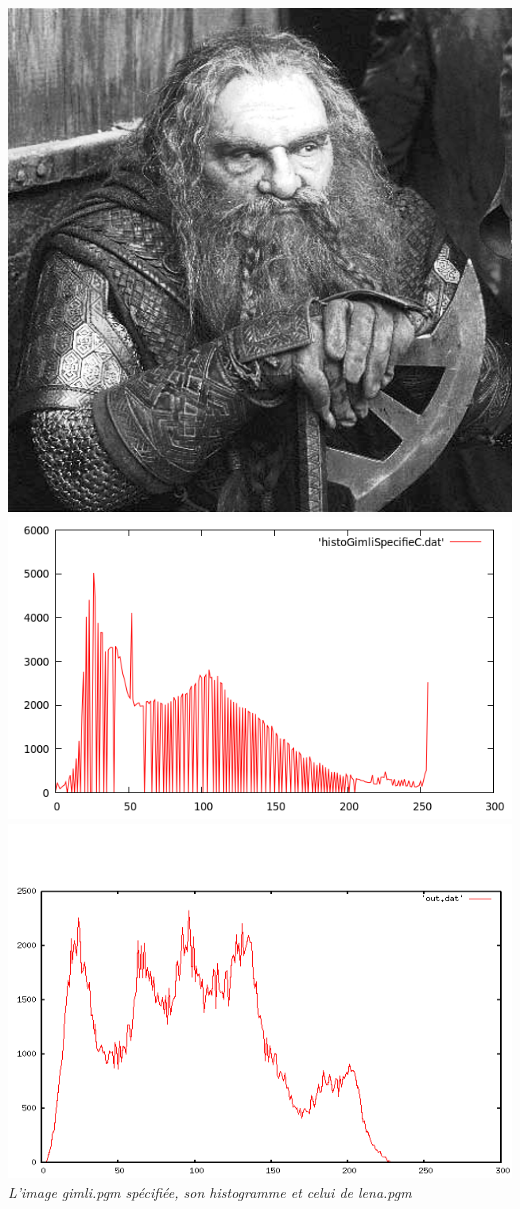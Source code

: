 \documentclass[a4paper,11pt]{article}
\begin{document}
\begin{center}
\includegraphics[scale=0.5]{gimlispecifiec.png}
\includegraphics[scale=0.25]{histoGimliSpecifie.png}
\includegraphics[scale=0.34]{histoLena.png}\\
\textit{L'image gimli.pgm spécifiée, son histogramme et celui de lena.pgm}
\end{center}
\end{document}
